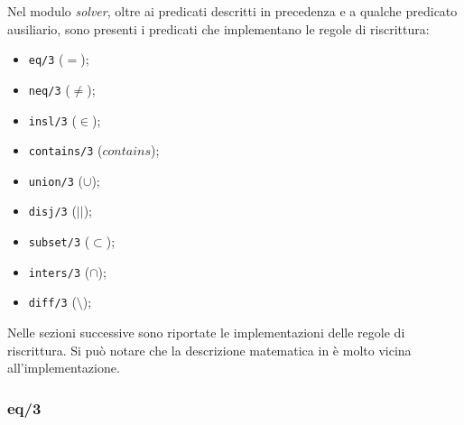 \documentclass[12pt,a4paper,openright]{book} %
\begin{document}
Nel modulo \emph{solver}, oltre ai predicati descritti in precedenza e a qualche predicato ausiliario, sono presenti i predicati che implementano le regole di riscrittura:
\begin{itemize}
\item \verb|eq/3| ($=$);
\item \verb|neq/3| ($\neq$);
\item \verb|insl/3| ($\in$);
\item \verb|contains/3| ($contains$);
\item \verb|union/3| ($\cup$);
\item \verb|disj/3| ($||$);
\item \verb|subset/3| ($\subset$);
\item \verb|inters/3| ($\cap$);
\item \verb|diff/3| ($\setminus$);
\end{itemize}

Nelle sezioni successive sono riportate le implementazioni delle regole di riscrittura. Si può notare che la descrizione matematica in \cite{Rossi18} è molto vicina all'implementazione.

\subsubsection{eq/3}
\end{document}

